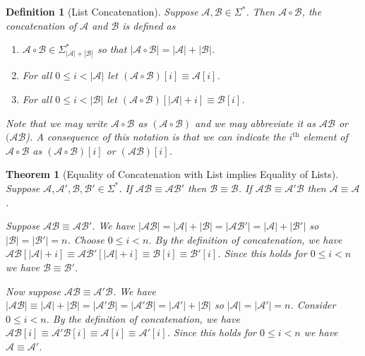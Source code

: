 \documentclass[12pt]{article}
\theoremstyle{break}
\newtheorem{definition}{Definition}[section]
\theoremstyle{break}
\newtheorem{theorem}{Theorem}[section]
\theoremstyle{break}
\theoremstyle{break}
\theoremstyle{break}
\newtheorem{informal definition}[definition]{Informal Definition}
\newcommand{\mc}[1]{\mathcal{#1}}
\begin{document}
\begin{definition}[List Concatenation]
Suppose $\mc{A}, \mc{B}\in\Sigma^*$.
Then $\mc{A}\circ \mc{B}$, the concatenation of $\mc{A}$ and $\mc{B}$ is defined as

\begin{enumerate}
\item{$\mc{A}\circ\mc{B} \in \Sigma_{|\mc{A}| + |\mc{B}|}^*$ so that $|\mc{A}\circ\mc{B}| = |\mc{A}| + |\mc{B}|$.}
\item{For all $0\le i < |\mc{A}|$ let $(\mc{A}\circ \mc{B})[i] \equiv \mc{A}[i]$.}
\item{For all $0\le i < |\mc{B}|$ let $(\mc{A}\circ\mc{B})[|\mc{A}| + i] \equiv \mc{B}[i]$.}
\end{enumerate}
Note that we may write $\mc{A}\circ\mc{B}$ as $(\mc{A}\circ\mc{B})$ and we may abbreviate it as $\mc{A}\mc{B}$ or $(\mc{A}\mc{B}$).
A consequence of this notation is that we can indicate the $i^{\text{th}}$ element of $\mc{A}\circ\mc{B}$ as $(\mc{A}\circ\mc{B})[i]$ or $(\mc{A}\mc{B})[i]$.
\end{definition}

\begin{theorem}[Equality of Concatenation with List implies Equality of Lists]
Suppose $\mc{A}, \mc{A}', \mc{B}, \mc{B}' \in \Sigma^*$.
If $\mc{A}\mc{B}\equiv \mc{A}\mc{B}'$ then $\mc{B}\equiv \mc{B}$.
If $\mc{A}\mc{B}\equiv \mc{A}'\mc{B}$ then $\mc{A}\equiv \mc{A}$.

Suppose $\mc{A}\mc{B} \equiv \mc{A}\mc{B}'$.
We have $|\mc{A}\mc{B}| = |\mc{A}| + |\mc{B}| = |\mc{A}\mc{B}'| = |\mc{A}| + |\mc{B}'|$ so $|\mc{B}| = |\mc{B}'| = n$.
Choose $0\le i < n$.
By the definition of concatenation, we have $\mc{A}\mc{B}[|\mc{A}| + i] \equiv \mc{A}\mc{B}'[|\mc{A}| + i] \equiv \mc{B}[i] \equiv \mc{B}'[i]$.
Since this holds for $0\le i < n$ we have $\mc{B} \equiv \mc{B}'$.

Now suppose $\mc{A}\mc{B}\equiv \mc{A}'\mc{B}$.
We have $|\mc{A}\mc{B}| \equiv |\mc{A}| + |\mc{B}| = |\mc{A}'\mc{B}| = |\mc{A}'\mc{B}| = |\mc{A}'| + |\mc{B}|$ so $|\mc{A}| = |\mc{A}'| = n$. Consider $0\le i < n$.
By the definition of concatenation, we have $\mc{A}\mc{B}[i] \equiv \mc{A}'\mc{B}[i] \equiv \mc{A}[i] \equiv \mc{A}'[i]$.
Since this holds for $0 \le i < n$ we have $\mc{A} \equiv \mc{A}'$.
\end{theorem}
\end{document}
